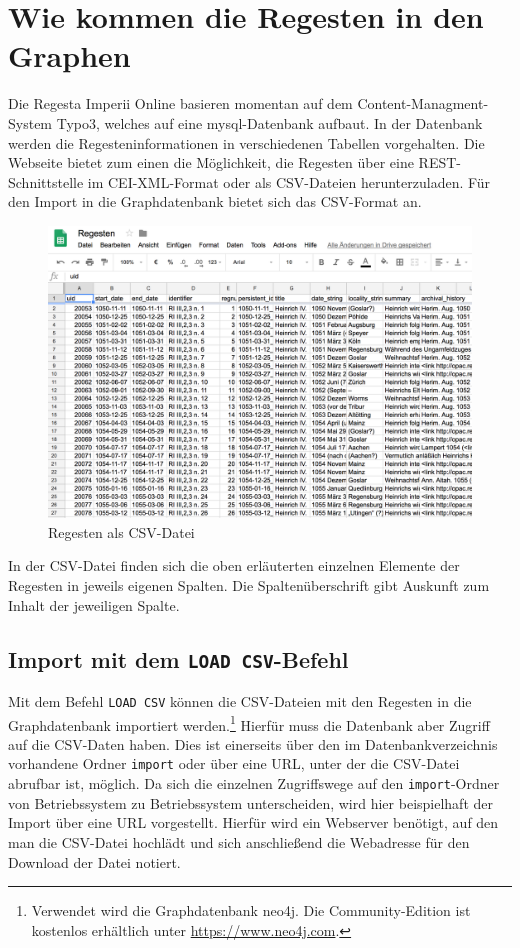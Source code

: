 \documentclass[ngerman,]{scrreprt}
\begin{document}
\section{Wie kommen die Regesten in den Graphen}\label{wie-kommen-die-regesten-in-den-graphen}

Die Regesta Imperii Online basieren momentan auf dem Content-Managment-System Typo3, welches auf eine mysql-Datenbank aufbaut. In der Datenbank werden die Regesteninformationen in verschiedenen Tabellen vorgehalten. Die Webseite bietet zum einen die Möglichkeit, die Regesten über eine REST-Schnittstelle im CEI-XML-Format oder als CSV-Dateien herunterzuladen. Für den Import in die Graphdatenbank bietet sich das CSV-Format an.

\begin{figure}
\centering
\includegraphics{Bilder/RI2Graph/ReggH4-Regestentabelle.png}
\caption{Regesten als CSV-Datei}
\end{figure}

In der CSV-Datei finden sich die oben erläuterten einzelnen Elemente der Regesten in jeweils eigenen Spalten. Die Spaltenüberschrift gibt Auskunft zum Inhalt der jeweiligen Spalte.

\subsection{\texorpdfstring{Import mit dem \texttt{LOAD\ CSV}-Befehl}{Import mit dem LOAD CSV-Befehl}}\label{import-mit-dem-load-csv-befehl}

Mit dem Befehl \texttt{LOAD\ CSV} können die CSV-Dateien mit den Regesten in die Graphdatenbank importiert werden.\footnote{Verwendet wird die Graphdatenbank neo4j. Die Community-Edition ist kostenlos erhältlich unter \url{https://www.neo4j.com}.} Hierfür muss die Datenbank aber Zugriff auf die CSV-Daten haben. Dies ist einerseits über den im Datenbankverzeichnis vorhandene Ordner \texttt{import} oder über eine URL, unter der die CSV-Datei abrufbar ist, möglich. Da sich die einzelnen Zugriffswege auf den \texttt{import}-Ordner von Betriebssystem zu Betriebssystem unterscheiden, wird hier beispielhaft der Import über eine URL vorgestellt. Hierfür wird ein Webserver benötigt, auf den man die CSV-Datei hochlädt und sich anschließend die Webadresse für den Download der Datei notiert.
\end{document}
